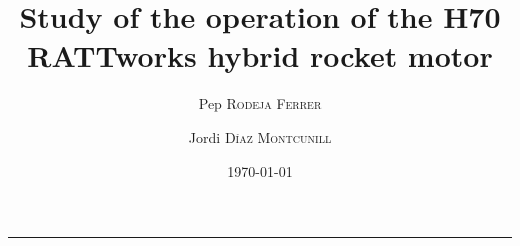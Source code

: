 \documentclass[paper=a4, fontsize=11pt]{scrartcl}
\title{Study of the operation of the H70 RATTworks hybrid rocket motor} %
\author{Pep \textsc{Rodeja Ferrer} \and Jordi \textsc{Díaz Montcunill}} %
\date{\today} %
\numberwithin{equation}{section}    %
\numberwithin{figure}{section}      %
\numberwithin{table}{section}        %
\newcommand{\horrule}[1]{\rule{\linewidth}{#1}}   %
\begin{document}
\maketitle %
\horrule{0.5pt}







\printbibliography
\end{document}
